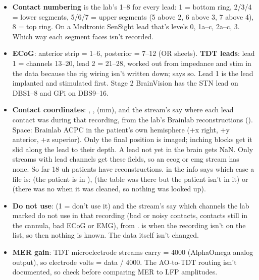 \begin{itemize}
  \item \textbf{Contact numbering} is the lab's 1--8 for every lead: 1 = bottom ring, 2/3/4 = lower segments, 5/6/7 = upper segments (5 above 2, 6 above 3, 7 above 4), 8 = top ring. On a Medtronic SenSight lead that's levels 0, 1a--c, 2a--c, 3. Which way each segment faces isn't recorded.
  \item \textbf{ECoG}: anterior strip = 1--6, posterior = 7--12 (OR sheets). \textbf{TDT leads}: lead 1 = channels 13--20, lead 2 = 21--28, worked out from impedance and stim in the data because the rig wiring isn't written down;  says so. Lead 1 is the lead implanted and stimulated first. Stage 2 BrainVision has the STN lead on DBS1--8 and GPi on DBS9--16.
  \item \textbf{Contact coordinates}: , ,  (mm),  and the stream's  say where each lead contact was during that recording, from the lab's Brainlab reconstructions (). Space: Brainlab ACPC in the patient's own hemisphere (+x right, +y anterior, +z superior). Only the final position is imaged; inching blocks get it slid along the lead to their depth. A lead not yet in the brain gets NaN. Only streams with lead channels get these fields, so an ecog or emg stream has none. So far 18 uh patients have reconstructions.  in the info says which case a file is:  (the patient is in ),  (the table was there but the patient isn't in it) or  (there was no  when it was cleaned, so nothing was looked up).
  \item \textbf{Do not use}:  (1 = don't use it) and the stream's  say which channels the lab marked do not use in that recording (bad or noisy contacts, contacts still in the cannula, bad ECoG or EMG), from .  is  when the recording isn't on the list, so then nothing is known. The data itself isn't changed.
  \item \textbf{MER gain}: TDT microelectrode streams carry  = 4000 (AlphaOmega analog output), so electrode volts = data / 4000. The AO-to-TDT routing isn't documented, so check before comparing MER to LFP amplitudes.
\end{itemize}

